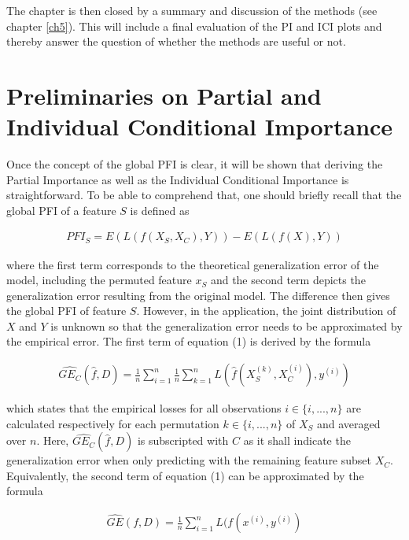 \documentclass[
]{krantz}
\begin{document}
The chapter is then closed by a summary and discussion of the methods (see chapter \ref{ch5}). This will include a final evaluation of the PI and ICI plots and thereby answer the question of whether the methods are useful or not.

\pagebreak

\hypertarget{ch2}{%
\section{Preliminaries on Partial and Individual Conditional Importance}\label{ch2}}

Once the concept of the global PFI is clear, it will be shown that deriving the Partial Importance as well as the Individual Conditional Importance is straightforward. To be able to comprehend that, one should briefly recall that the global PFI of a feature \(S\) is defined as

\begin{align}
PFI_{S} = E(L(f(X_{S}, X_{C}), Y)) - E(L(f(X), Y)) \label{eq:eq1}\tag{1}
\end{align}

where the first term corresponds to the theoretical generalization error of the model, including the permuted feature \(x_{S}\) and the second term depicts the generalization error resulting from the original model. The difference then gives the global PFI of feature \(S\). However, in the application, the joint distribution of \(X\) and \(Y\) is unknown so that the generalization error needs to be approximated by the empirical error. The first term of equation (1) is derived by the formula

\begin{align}
\widehat{GE_{C}}(\hat{f}, D) = \frac{1}{n} \sum_{i = 1}^{n}\frac{1}{n} \sum_{k = 1}^{n}L(\hat{f}(X_{S}^{(k)}, X_{C}^{(i)}),  y^{(i)}) \label{eq:e2}\tag{2}
\end{align}

which states that the empirical losses for all observations \(i \in \{i, ..., n\}\) are calculated respectively for each permutation \(k \in \{i, ..., n\}\) of \(X_{S}\) and averaged over \(n\). Here, \(\widehat{GE_{C}}(\hat{f}, D)\) is subscripted with \(C\) as it shall indicate the generalization error when only predicting with the remaining feature subset \(X_{C}\). Equivalently, the second term of equation (1) can be approximated by the formula

\begin{align}
\widehat{GE}(f, D) = \frac{1}{n}\sum_{i = 1}^{n}L(f(x^{(i)}, y^{(i)}) \label{eq:eq3}\tag{3}
\end{align}
\end{document}
